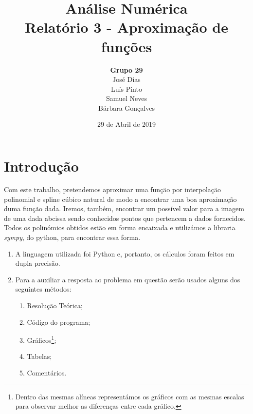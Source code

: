 \documentclass{article}
\title{\textbf{Análise Numérica\\Relatório 3 - Aproximação de funções}}
\author{\textbf{Grupo 29}\\[4mm]José Dias\\Luís Pinto\\Samuel Neves\\Bárbara Gonçalves\\}
\date{29 de Abril de 2019}
\begin{document}
\maketitle
\clearpage
\pagestyle{fancy}
\fancyhf{}
\setlength{\headheight}{30pt}
\setlength{\footskip}{15pt}
\rfoot{\thepage}
\section{Introdução}
\hspace{6mm}Com este trabalho, pretendemos aproximar uma função por interpolação polinomial e spline cúbico natural de modo a encontrar uma boa aproximação duma função dada. Iremos, também, encontrar um possível valor para a imagem de uma dada abcissa sendo conhecidos pontos que pertencem a dados fornecidos. Todos os polinómios obtidos estão em forma encaixada e utilizámos a libraria \textit{sympy}, do python, para encontrar essa forma.
\begin{enumerate}
  \item{A linguagem utilizada foi Python e, portanto, os cálculos foram feitos em dupla precisão.}
  \item{Para a auxiliar a resposta ao problema em questão serão usados alguns dos seguintes métodos:}
  \begin{enumerate}
    \item[\textbullet]{Resolução Teórica;}
    \item[\textbullet]{Código do programa;}
    \item[\textbullet]{Gráficos\footnote{Dentro das mesmas alíneas representámos os gráficos com as mesmas escalas para observar melhor as diferenças entre cada gráfico.};}
    \item[\textbullet]{Tabelas;}
    \item[\textbullet]{Comentários.}

  \end{enumerate}
\end{enumerate}
\end{document}
